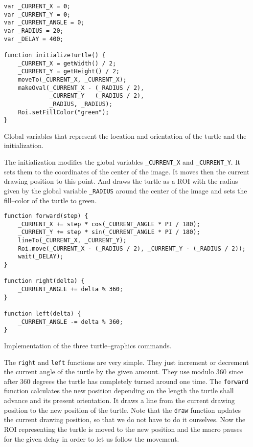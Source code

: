 \begin{listing}[H]
\begin{verbatim} 
var _CURRENT_X = 0;
var _CURRENT_Y = 0;
var _CURRENT_ANGLE = 0;
var _RADIUS = 20;
var _DELAY = 400;

function initializeTurtle() {
	_CURRENT_X = getWidth() / 2;
	_CURRENT_Y = getHeight() / 2;
	moveTo(_CURRENT_X, _CURRENT_X);
	makeOval(_CURRENT_X - (_RADIUS / 2), 
	         _CURRENT_Y - (_RADIUS / 2), 
	         _RADIUS, _RADIUS);
	Roi.setFillColor("green");
}

\end{verbatim}
\caption{Global variables that represent the location and orientation of the turtle and the initialization.}
\label{lst:turtle_variables} 
\end{listing}

The initialization modifies the global variables {\tt \_CURRENT\_X} and {\tt \_CURRENT\_Y}. It sets them to the coordinates of the center of the image. It moves then the current drawing position to this point. And draws the turtle as a ROI with the radius given by the global variable {\tt \_RADIUS} around the center of the image and sets the fill--color of the turtle to green.

\begin{listing}[H]
\begin{verbatim} 
function forward(step) {
	_CURRENT_X += step * cos(_CURRENT_ANGLE * PI / 180);	
	_CURRENT_Y += step * sin(_CURRENT_ANGLE * PI / 180);
	lineTo(_CURRENT_X, _CURRENT_Y);
	Roi.move(_CURRENT_X - (_RADIUS / 2), _CURRENT_Y - (_RADIUS / 2));
	wait(_DELAY);
}

function right(delta) {
	_CURRENT_ANGLE += delta % 360;
}

function left(delta) {
	_CURRENT_ANGLE -= delta % 360;
}
\end{verbatim}
\caption{Implementation of the three turtle--graphics commands.}
\label{lst:turtle_commands} 
\end{listing}
 
The {\tt right} and {\tt left} functions are very simple. They just increment or decrement the current angle of the turtle by the given amount. They use modulo 360 since after 360 degrees the turtle has completely turned around one time. The {\tt forward} function calculates the new position depending on the length the turtle shall advance and its present orientation. It draws a line from the current drawing position to the new position of the turtle. Note that the {\tt draw} function updates the current drawing position, so that we do not have to do it ourselves. Now the ROI representing the turtle is moved to the new position and the macro pauses for the given delay in order to let us follow the movement. 

